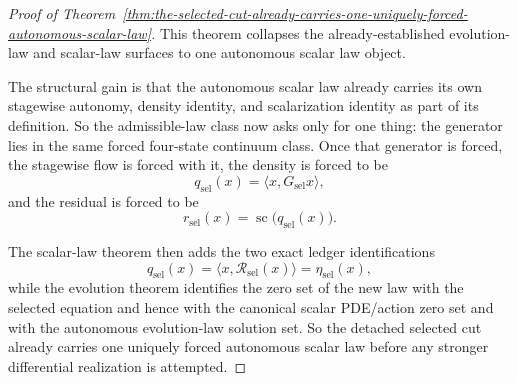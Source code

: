 \begin{proof}[Proof of Theorem~\ref{thm:the-selected-cut-already-carries-one-uniquely-forced-autonomous-scalar-law}]
\label{proof:thm:the-selected-cut-already-carries-one-uniquely-forced-autonomous-scalar-law}
This theorem collapses the already-established evolution-law and scalar-law
surfaces to one autonomous scalar law object.

The structural gain is that the autonomous scalar law already carries its own
stagewise autonomy, density identity, and scalarization identity as part of
its definition. So the admissible-law class now asks only for one thing: the
generator lies in the same forced four-state continuum class. Once that
generator is forced, the stagewise flow is forced with it, the density is
forced to be
\[
q_{\mathrm{sel}}(x)=\langle x,G_{\mathrm{sel}}x\rangle,
\]
and the residual is forced to be
\[
r_{\mathrm{sel}}(x)=\operatorname{sc}\!\bigl(q_{\mathrm{sel}}(x)\bigr).
\]

The scalar-law theorem then adds the two exact ledger identifications
\[
q_{\mathrm{sel}}(x)
 =\langle x,\mathcal R_{\mathrm{sel}}(x)\rangle
 =\eta_{\mathrm{sel}}(x),
\]
while the evolution theorem identifies the zero set of the new law with the
selected equation and hence with the canonical scalar PDE/action zero set and
with the autonomous evolution-law solution set. So the detached selected cut
already carries one uniquely forced autonomous scalar law before any stronger
differential realization is attempted.
\end{proof}

